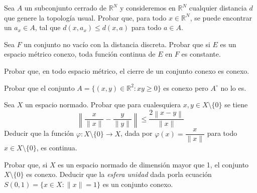 \begin{ejercicio}
Sea \( A \) un subconjunto cerrado de \( \mathbb{R}^N \) y consideremos en \( \mathbb{R}^N \) cualquier distancia \( d \) que genere la topología usual. Probar que, para todo \( x \in \mathbb{R}^N \), se puede encontrar un \( a_x \in A \), tal que \( d(x, a_x) \leq d(x, a) \) para todo \( a \in A \).
\end{ejercicio}

\begin{ejercicio}
Sea \( F \) un conjunto no vacío con la distancia discreta. Probar que si \( E \) es un espacio métrico conexo, toda función continua de \( E \) en \( F \) es constante.
\end{ejercicio}

\begin{ejercicio}
Probar que, en todo espacio métrico, el cierre de un conjunto conexo es conexo.
\end{ejercicio}

\begin{ejercicio}
Probar que el conjunto \( A = \{ (x,y) \in \mathbb{R}^2 : xy \geq 0 \} \) es conexo pero \( A^\circ \) no lo es.
\end{ejercicio}

\begin{ejercicio}
Sea \( X \) un espacio normado. Probar que para cualesquiera \( x, y \in X \setminus \{0\} \) se tiene
\[
    \left\| \frac{x}{\|x\|} - \frac{y}{\|y\|} \right\| \leq \frac{2\left\| x - y \right\|}{\|x\|}
\]
Deducir que la función \( \varphi : X \setminus \{0\} \rightarrow X \), dada por \( \varphi(x) = \dfrac{x}{\|x\|} \) para todo \( x \in X \setminus \{0\} \), es continua.
\end{ejercicio}

\begin{ejercicio}
Probar que, si \( X \) es un espacio normado de dimensión mayor que 1, el conjunto \( X \setminus \{0\} \) es conexo. Deducir que la \textit{esfera unidad} dada porla ecuación \( S(0,1) = \{ x \in X : \|x\| = 1 \} \) es un conjunto conexo.
\end{ejercicio}